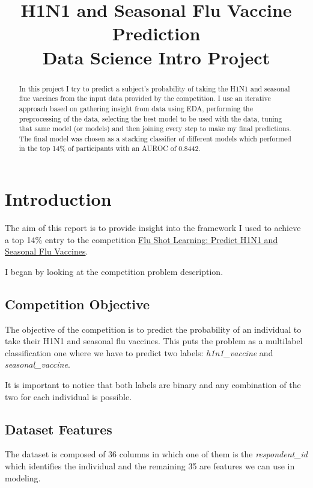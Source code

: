 \documentclass[10pt,a4paper]{article}
\title{H1N1 and Seasonal Flu Vaccine Prediction\\
\Large Data Science Intro Project}
\begin{document}
\maketitle

\begin{abstract}
   In this project I try to predict a subject's probability of taking the H1N1 and seasonal flue vaccines from the input data provided by the competition.
   I use an iterative approach based on gathering insight from data using EDA, performing the preprocessing of the data, selecting the best model to be used with the data, tuning that same model (or models) and then joining every step to make my final predictions.
   The final model was chosen as a stacking classifier of different models which performed in the top 14\% of participants with an AUROC of 0.8442.
\end{abstract}

\tableofcontents

\pagebreak
\section{Introduction}

The aim of this report is to provide insight into the framework I used to achieve a top 14\% entry to the competition \href{https://www.drivendata.org/competitions/66/flu-shot-learning/}{Flu Shot Learning: Predict H1N1 and Seasonal Flu Vaccines}.

I began by looking at the competition problem description.

\subsection{Competition Objective}

The objective of the competition is to predict the probability of an individual to take their H1N1 and seasonal flu vaccines. This puts the problem as a multilabel classification one where we have to predict two labels: \textit{h1n1\_vaccine} and \textit{seasonal\_vaccine}.

It is important to notice that both labels are binary and any combination of the two for each individual is possible.

\subsection{Dataset Features}

The dataset is composed of 36 columns in which one of them is the \textit{respondent\_id} which identifies the individual and the remaining 35 are features we can use in modeling.
\end{document}
